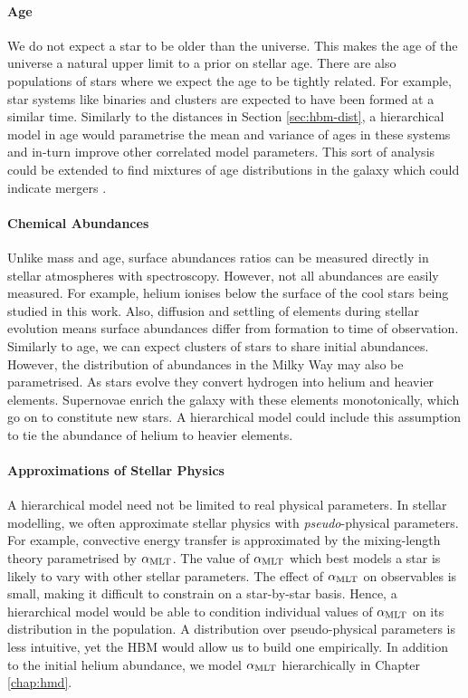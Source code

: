 \paragraph{Age} We do not expect a star to be older than the universe. This makes the age of the universe a natural upper limit to a prior on stellar age. There are also populations of stars where we expect the age to be tightly related. For example, star systems like binaries and clusters are expected to have been formed at a similar time. Similarly to the distances in Section \ref{sec:hbm-dist}, a hierarchical model in age would parametrise the mean and variance of ages in these systems and in-turn improve other correlated model parameters. This sort of analysis could be extended to find mixtures of age distributions in the galaxy which could indicate mergers \citep[e.g. \emph{Gaia}-Enceladus;][]{Helmi.Babusiaux.ea2018}. 

\paragraph{Chemical Abundances} Unlike mass and age, surface abundances ratios can be measured directly in stellar atmospheres with spectroscopy. However, not all abundances are easily measured. For example, helium ionises below the surface of the cool stars being studied in this work. Also, diffusion and settling of elements during stellar evolution means surface abundances differ from formation to time of observation. Similarly to age, we can expect clusters of stars to share initial abundances. However, the distribution of abundances in the Milky Way may also be parametrised. As stars evolve they convert hydrogen into helium and heavier elements. Supernovae enrich the galaxy with these elements monotonically, which go on to constitute new stars. A hierarchical model could include this assumption to tie the abundance of helium to heavier elements.

\paragraph{Approximations of Stellar Physics} A hierarchical model need not be limited to real physical parameters. In stellar modelling, we often approximate stellar physics with \emph{pseudo}-physical parameters. For example, convective energy transfer is approximated by the mixing-length theory \citep[MLT;][]{Gough1977} parametrised by \({\alpha_\mathrm{MLT}}\). The value of \({\alpha_\mathrm{MLT}}\) which best models a star is likely to vary with other stellar parameters. The effect of \({\alpha_\mathrm{MLT}}\) on observables is small, making it difficult to constrain on a star-by-star basis. Hence, a hierarchical model would be able to condition individual values of \({\alpha_\mathrm{MLT}}\) on its distribution in the population. A distribution over pseudo-physical parameters is less intuitive, yet the HBM would allow us to build one empirically. In addition to the initial helium abundance, we model \({\alpha_\mathrm{MLT}}\) hierarchically in Chapter \ref{chap:hmd}.

